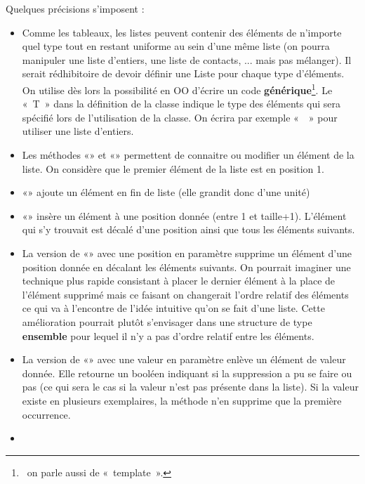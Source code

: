 \bigskip

Quelques précisions s’imposent :

\liststyleListv
\begin{itemize}
	\item 
		Comme les tableaux, les listes peuvent contenir des éléments de
		n’importe quel type tout en restant uniforme au sein d’une même liste
		(on pourra manipuler une liste d’entiers, une liste de contacts, ...
		mais pas mélanger). Il serait rédhibitoire de devoir définir une Liste
		pour chaque type d’éléments. On utilise dès lors la possibilité en OO
		d’écrire un code \textbf{générique}\footnote{\ on parle aussi de
		«~template~».}. Le «~T~» dans la définition de la classe indique le
		type des éléments qui sera spécifié lors de l’utilisation de la classe.
		On écrira par exemple «~~» pour
		utiliser une liste d’entiers.
	\item 
		Les méthodes «» et «»
		permettent de connaitre ou modifier un élément de la liste. On
		considère que le premier élément de la liste est en position 1.
	\item 
		«» ajoute un élément en fin de liste (elle
		grandit donc d’une unité)
	\item 
		«» insère un élément à une position donnée
		(entre 1 et taille+1). L’élément qui s’y trouvait est décalé
		d'une position ainsi que tous les éléments suivants.
	\item 
		La version de «» avec une position en
		paramètre supprime un élément d'une position donnée en
		décalant les éléments suivants. On pourrait imaginer une technique plus
		rapide consistant à placer le dernier élément à la place de l’élément
		supprimé mais ce faisant on changerait l’ordre relatif des éléments ce
		qui va à l’encontre de l’idée intuitive qu’on se fait d’une liste.
		Cette amélioration pourrait plutôt s’envisager dans une structure de
		type \textbf{ensemble} pour lequel il n’y a pas d’ordre relatif entre
		les éléments.
	\item 
		La version de «» avec une valeur en
		paramètre enlève un élément de valeur donnée. Elle retourne un booléen
		indiquant si la suppression a pu se faire ou pas (ce qui sera le cas si
		la valeur n’est pas présente dans la liste). Si la valeur existe en
		plusieurs exemplaires, la méthode n’en supprime que la première
		occurrence.
	\item 

\end{itemize}
